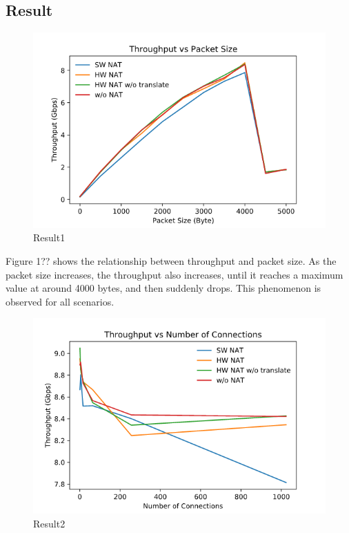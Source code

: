 \subsection{Result}

\begin{figure}
    \includegraphics[width=\linewidth]{images/Result1.png}
    \caption{Result1}
\end{figure}

Figure 1?? shows the relationship between throughput and packet size. As the packet size increases, the throughput also increases, until it reaches a maximum value at around 4000 bytes, and then suddenly drops. This phenomenon is observed for all scenarios.

\begin{figure}
    \includegraphics[width=\linewidth]{images/Result2.png}
    \caption{Result2}
\end{figure}

